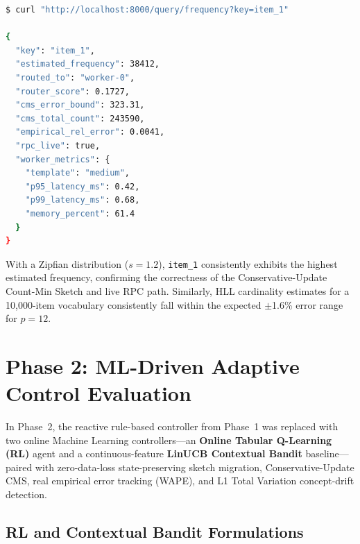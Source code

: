 \begin{lstlisting}[language=bash, caption=Sample live frequency query and response via Redis RPC.]
$ curl "http://localhost:8000/query/frequency?key=item_1"

{
  "key": "item_1",
  "estimated_frequency": 38412,
  "routed_to": "worker-0",
  "router_score": 0.1727,
  "cms_error_bound": 323.31,
  "cms_total_count": 243590,
  "empirical_rel_error": 0.0041,
  "rpc_live": true,
  "worker_metrics": {
    "template": "medium",
    "p95_latency_ms": 0.42,
    "p99_latency_ms": 0.68,
    "memory_percent": 61.4
  }
}
\end{lstlisting}

With a Zipfian distribution ($s = 1.2$), \texttt{item\_1} consistently exhibits the highest estimated frequency, confirming the correctness of the Conservative-Update Count-Min Sketch and live RPC path. Similarly, HLL cardinality estimates for a 10,000-item vocabulary consistently fall within the expected $\pm$1.6\% error range for $p = 12$.

\section{Phase 2: ML-Driven Adaptive Control Evaluation}

In Phase~2, the reactive rule-based controller from Phase~1 was replaced with two online Machine Learning controllers---an \textbf{Online Tabular Q-Learning (RL)} agent and a continuous-feature \textbf{LinUCB Contextual Bandit} baseline---paired with zero-data-loss state-preserving sketch migration, Conservative-Update CMS, real empirical error tracking (WAPE), and L1 Total Variation concept-drift detection.

\subsection{RL and Contextual Bandit Formulations}

